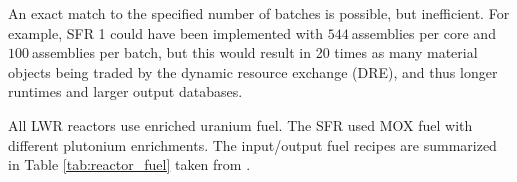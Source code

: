 \documentclass[12pt]{article}
\begin{document}
An exact match to the specified number of batches is possible, but
inefficient.  For example, SFR 1 could have been implemented with
$544~$assemblies per core and $100~$assemblies per batch, but this would
result in 20 times as many material objects being traded by the dynamic
resource exchange (DRE), and thus longer runtimes and larger output databases.




%


All LWR reactors use enriched uranium fuel. The SFR used MOX fuel with
different plutonium enrichments. The input/output fuel recipes are summarized
in Table \ref{tab:reactor_fuel} taken from \cite{B.Feng_calculation}.
\end{document}
